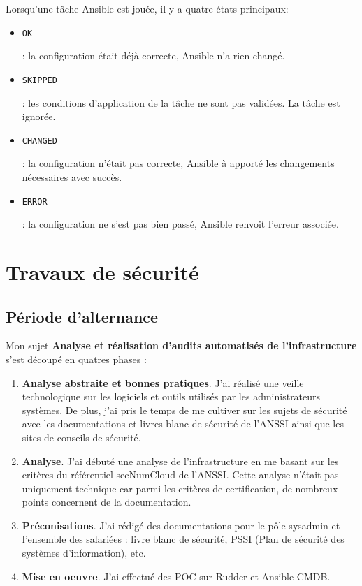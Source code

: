 \documentclass[12pt]{article}
\begin{document}
Lorsqu'une tâche \gls{Ansible} est jouée, il y a quatre états principaux:
\begin{itemize}
    \item \begin{code}\texttt{OK}\end{code}: la configuration était déjà correcte, \gls{Ansible} n'a rien changé.
    \item \begin{code}\texttt{SKIPPED}\end{code}: les conditions d'application de la tâche ne sont pas validées. La tâche est ignorée.
    \item \begin{code}\texttt{CHANGED}\end{code}: la configuration n'était pas correcte, \gls{Ansible} à apporté les changements nécessaires avec succès.
    \item \begin{code}\texttt{ERROR}\end{code}: la configuration ne s'est pas bien passé, \gls{Ansible} renvoit l'erreur associée.
\end{itemize}

\newpage
\section{Travaux de sécurité}
\subsection{Période d'alternance}
Mon sujet \textbf{Analyse et réalisation d'audits automatisés de l'infrastructure} s'est découpé en quatres phases :

\begin{enumerate}
    \item \textbf{Analyse abstraite et bonnes pratiques}. J'ai réalisé une veille technologique sur les logiciels et outils utilisés par les administrateurs systèmes. 
    De plus, j'ai pris le temps de me cultiver sur les sujets de sécurité avec les documentations et livres blanc de sécurité de l'\gls{ANSSI} ainsi que les sites de conseils de sécurité.
    \item \textbf{Analyse}. J'ai débuté une analyse de l'infrastructure en me basant sur les critères du référentiel secNumCloud de l'\gls{ANSSI}. 
    Cette analyse n'était pas uniquement technique car parmi les critères de certification, de nombreux points concernent de la documentation.
    \item \textbf{Préconisations}. J'ai rédigé des documentations pour le pôle \gls{sysadmin} et l'ensemble des salariées : livre blanc de sécurité, PSSI (Plan de sécurité des systèmes d'information), etc.
    \item \textbf{Mise en oeuvre}. J'ai effectué des \gls{POC} sur Rudder et \gls{Ansible CMDB}.
\end{enumerate}
\end{document}

